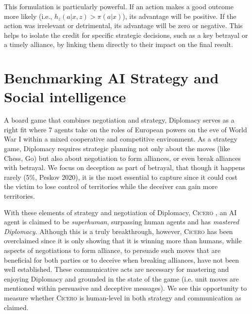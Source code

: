 \documentclass[oneside]{memoir}
\newcommand{\cicero}{\abr{Cicero} }
\newcommand{\abr}[1]{\textsc{#1}}
\begin{document}
This formulation is particularly powerful. If an action makes a good outcome more likely (i.e., $h_z(a|x, z) > \pi(a|x)$), its advantage will be positive. If the action was irrelevant or detrimental, its advantage will be zero or negative. This helps to isolate the credit for specific strategic decisions, such as a key betrayal or a timely alliance, by linking them directly to their impact on the final result.


%
%




%
%

\chapter{Benchmarking AI Strategy and Social intelligence}
\label{ch:benchmark_cicero}
A board game that combines negotiation and strategy, Diplomacy serves as a right fit where 7 agents take on the roles of European powers on the eve of World War I within a mixed cooperative and competitive environment. As a strategy game, Diplomacy requires strategic planning not only about the moves (like Chess, Go) but also about negotiation to form alliances, or even break alliances with betrayal. We focus on deception as part of betrayal, that though it happens rarely (5\%, Peskov 2020), it is the most essential to capture since it could cost the victim to lose control of territories while the deceiver can gain more territories.

With these elements of strategy and negotiation of Diplomacy, \cicero, an AI agent is claimed to be \textit{superhuman}, surpassing human agents and has \textit{mastered Diplomacy}. Although this is a truly breakthrough, however, \cicero has been overclaimed since it is only showing that it is winning more than humans, while aspects of negotiations to form alliance, to persuade such moves that are beneficial for both parties or to deceive when breaking alliances, have not been well established. These communicative acts are necessary for mastering and enjoying Diplomacy and grounded in the state of the game (i.e. unit moves are mentioned within persuasive and deceptive messages). We see this opportunity to measure whether \cicero is human-level in both strategy and communication as claimed.
\end{document}
